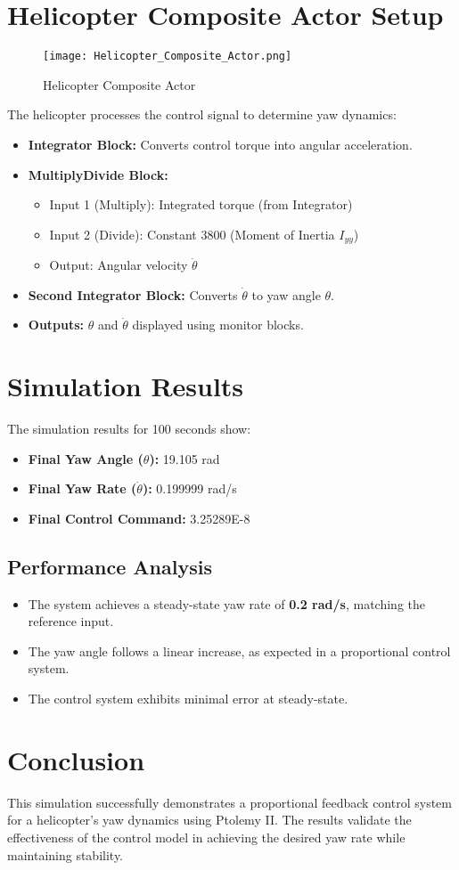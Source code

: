\documentclass{article}
\begin{document}
\section{Helicopter Composite Actor Setup}
\begin{figure}
    \centering
    \texttt{[image: Helicopter\_Composite\_Actor.png]}
    \caption{Helicopter Composite Actor}
    \label{fig:helicopter}
\end{figure}
The helicopter processes the control signal to determine yaw dynamics:
\begin{itemize}
    \item \textbf{Integrator Block:} Converts control torque into angular acceleration.
    \item \textbf{MultiplyDivide Block:}
    \begin{itemize}
        \item Input 1 (Multiply): Integrated torque (from Integrator)
        \item Input 2 (Divide): Constant 3800 (Moment of Inertia $I_{yy}$)
        \item Output: Angular velocity $\dot{\theta}$
    \end{itemize}
    \item \textbf{Second Integrator Block:} Converts $\dot{\theta}$ to yaw angle $\theta$.
    \item \textbf{Outputs:} $\theta$ and $\dot{\theta}$ displayed using monitor blocks.
\end{itemize}

\section{Simulation Results}
The simulation results for 100 seconds show:
\begin{itemize}
    \item \textbf{Final Yaw Angle ($\theta$):} 19.105 rad
    \item \textbf{Final Yaw Rate ($\dot{\theta}$):} 0.199999 rad/s
    \item \textbf{Final Control Command:} 3.25289E-8
\end{itemize}

\subsection{Performance Analysis}
\begin{itemize}
    \item The system achieves a steady-state yaw rate of \textbf{0.2 rad/s}, matching the reference input.
    \item The yaw angle follows a linear increase, as expected in a proportional control system.
    \item The control system exhibits minimal error at steady-state.
\end{itemize}

\section{Conclusion}
This simulation successfully demonstrates a proportional feedback control system for a helicopter's yaw dynamics using Ptolemy II. The results validate the effectiveness of the control model in achieving the desired yaw rate while maintaining stability. 
\end{document}
